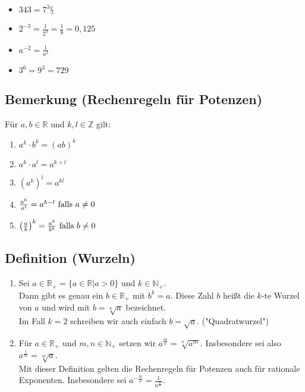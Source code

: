 	\begin{itemize}
	\item $343 = 7^3§$
	\item $2^{-3}=\frac{1}{2^3}=\frac{1}{8}=0,125$
	\item $a^{-2}=\frac{1}{a^2}$
	\item $3^6=9^3=729$
	\end{itemize}
	
	
\subsection[Rechenregeln für Potenzen]{Bemerkung (Rechenregeln für Potenzen)}

	Für $a,b \in \mathbb{R}$ und $k,l\in \mathbb{Z}$ gilt:
	
	\begin{enumerate}
	\item $a^k \cdot b^k = (ab)^k$
	\item $a^k \cdot a^l = a^{k+l}$
	\item ${\left(  a^k \right)}^l=a^{kl}$
	\item $\frac{a^k}{a^l}=a^{k-l} \textnormal{ falls } a \neq 0$
	\item ${\left( \frac{a}{b} \right) }^k = \frac{a^k}{b^k} \textnormal{ falls } b \neq 0$
	\end{enumerate}
	
	
\subsection[Wurzeln]{Definition (Wurzeln)}

	\begin{enumerate}
	\item Sei $a \in \mathbb{R_+}=\{a \in \mathbb{R}|a > 0 \}$ und $k\in \mathbb{N_+}$.\\
	Dann gibt es genau ein $b\in \mathbb{R_+}$ mit $b^k=a$. Diese Zahl $b$ heißt die $k$-te Wurzel von $a$ 
	und wird mit $b=\sqrt[k]{a}$ bezeichnet.\\
	Im Fall $k=2$ schreiben wir auch einfach $b=\sqrt{a}$. ("Quadratwurzel") 
	
	\item Für $a\in \mathbb{R_+}$ und $m,n\in \mathbb{N_+}$ setzen wir $a^{\frac{m}{n}}=\sqrt[n]{a^m}$.
	Insbesondere sei also $a^{\frac{1}{m}}=\sqrt[m]{a}$.\\
	Mit dieser Definition gelten die Rechenregeln für Potenzen auch für rationale Exponenten. Insbesondere
	sei $a^{-\frac{m}{n}}=\frac{1}{a^{\frac{m}{n}}}$.
	\end{enumerate}
	
